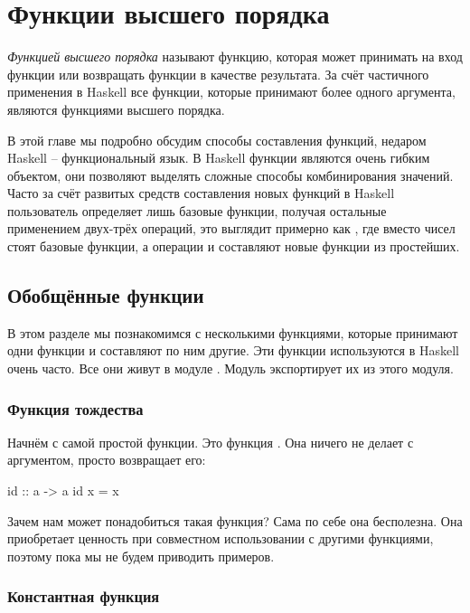 \setcounter{chapter}{4}
\chapter{Функции высшего порядка}

\emph{Функцией высшего порядка} называют функцию, которая может
принимать на вход функции или возвращать функции в качестве результата.
За счёт частичного применения в Haskell все функции,
которые принимают более одного аргумента, являются функциями
высшего порядка. 

В этой главе мы подробно обсудим способы 
составления функций, недаром Haskell -- функциональный язык.
В Haskell функции являются очень гибким объектом, они позволяют
выделять сложные способы комбинирования значений. Часто за счёт
развитых средств составления новых функций в Haskell пользователь 
определяет лишь базовые функции, получая остальные 
применением двух-трёх операций, это выглядит примерно как ,
где вместо чисел стоят базовые функции, а операции \In{+} и \In{*} составляют
новые функции из простейших.

\section{Обобщённые функции}

В этом разделе мы познакомимся с несколькими функциями,
которые принимают одни функции и составляют по ним другие.
Эти функции используются в Haskell очень часто. 
Все они живут в модуле . Модуль 
экспортирует их из этого модуля. 

\subsection{Функция тождества}

Начнём с самой простой функции. Это функция .
Она ничего не делает с аргументом, просто возвращает его:

\begin{code}
id :: a -> a
id x = x
\end{code}

Зачем нам может понадобиться такая функция? Сама по себе
она бесполезна. Она приобретает ценность при совместном 
использовании с другими функциями, поэтому пока мы не будем 
приводить примеров.

\subsection{Константная функция}

